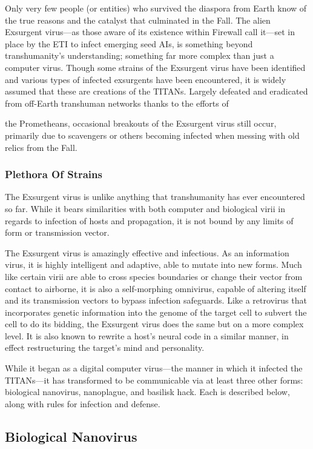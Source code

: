 Only very few people (or entities) who survived the diaspora from Earth know of the true reasons and the catalyst that culminated in the Fall. The alien Exsurgent virus—as those aware of its existence within Firewall call it—set in place by the ETI to infect emerging seed AIs, is something beyond transhumanity's understanding; something far more complex than just a computer virus. Though some strains of the Exsurgent virus have been identified and various types of infected exsurgents have been encountered, it is widely assumed that these are creations of the TITANs. Largely defeated and eradicated from off-Earth transhuman networks thanks to the efforts of 

the Prometheans, occasional breakouts of the Exsurgent virus still occur, primarily due to scavengers or others becoming infected when messing with old relics from the Fall. 

\subsubsection{Plethora Of Strains } 

The Exsurgent virus is unlike anything that transhumanity has ever encountered so far. While it bears similarities with both computer and biological virii in regards to infection of hosts and propagation, it is not bound by any limits of form or transmission vector. 

The Exsurgent virus is amazingly effective and infectious. As an information virus, it is highly intelligent and adaptive, able to mutate into new forms. Much like certain virii are able to cross species boundaries or change their vector from contact to airborne, it is also a self-morphing omnivirus, capable of altering itself and its transmission vectors to bypass infection safeguards. Like a retrovirus that incorporates genetic information into the genome of the target cell to subvert the cell to do its bidding, the Exsurgent virus does the same but on a more complex level. It is also known to rewrite a host's neural code in a similar manner, in effect restructuring the target's mind and personality. 

While it began as a digital computer virus—the manner in which it infected the TITANs—it has transformed to be communicable via at least three other forms: biological nanovirus, nanoplague, and basilisk hack. Each is described below, along with rules for infection and defense. 

\subsection{Biological Nanovirus} 

